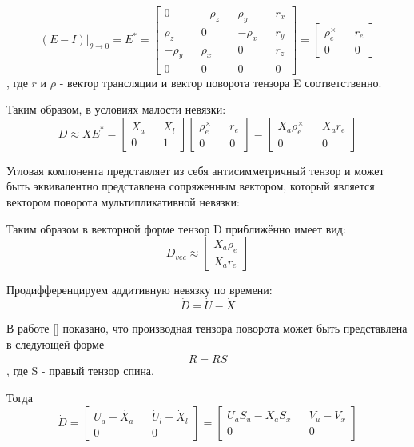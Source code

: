 \documentclass[a4paper]{article}
\begin{document}
$$
(E - I)|_{\theta\rightarrow0} = E^* = 
\begin{bmatrix}
0         && -\rho_z &&  \rho_y && r_x\\
 \rho_z && 0         && -\rho_x && r_y\\
-\rho_y &&  \rho_x && 0         && r_z\\
0&&0&&0&&0
\end{bmatrix} = \begin{bmatrix}\rho_e^\times&&r_e\\0&&0\end{bmatrix}
$$
, где $r$ и $\rho$ - вектор трансляции и вектор поворота тензора E соответственно.

Таким образом, в условиях малости невязки:
\begin{equation} D \approx X E^* = \begin{bmatrix}X_a&&X_l\\0&&1\end{bmatrix} \begin{bmatrix}\rho_e^\times&&r_e\\0&&0\end{bmatrix} = \begin{bmatrix}X_a\rho_e^\times&&X_ar_e\\0&&0\end{bmatrix} \end{equation}

Угловая компонента представляет из себя антисимметричный тензор и может быть эквивалентно представлена сопряженным вектором, который является вектором поворота мультипликативной невязки:

Таким образом в векторной форме тензор D приближённо имеет вид:
\begin{equation} D_{vec} \approx \begin{bmatrix}X_a\rho_e\\X_ar_e\end{bmatrix} \end{equation}

Продифференцируем аддитивную невязку по времени:
\begin{equation} \dot{D} = \dot{U} -\dot{X} \end{equation}

В работе [] показано, что производная тензора поворота может быть представлена в следующей форме
\begin{equation} \dot{R} = R S \end{equation}
, где S - правый тензор спина.

Тогда 
\begin{equation} 
\dot{D} = \begin{bmatrix}\dot{U_a} - \dot{X_a}&&\dot{U}_l-\dot{X}_l\\0&&0\end{bmatrix} 
= \begin{bmatrix}U_aS_u - X_aS_x&&V_u-V_x\\0&&0\end{bmatrix}\end{equation}
\end{document}
